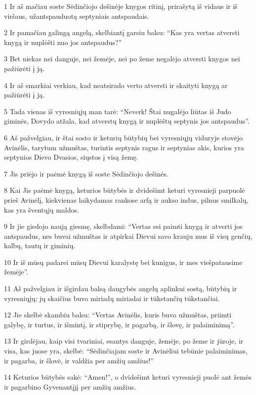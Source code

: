 \par 1 Ir aš mačiau soste Sėdinčiojo dešinėje knygos ritinį, prirašytą iš vidaus ir iš viršaus, užantspauduotą septyniais antspaudais. 
\par 2 Ir pamačiau galingą angelą, skelbiantį garsiu balsu: “Kas yra vertas atversti knygą ir nuplėšti nuo jos antspaudus?” 
\par 3 Bet niekas nei danguje, nei žemėje, nei po žeme negalėjo atversti knygos nei pažiūrėti į ją. 
\par 4 Ir aš smarkiai verkiau, kad neatsirado verto atversti ir skaityti knygą ar pažiūrėti į ją. 
\par 5 Tada vienas iš vyresniųjų man tarė: “Neverk! Štai nugalėjo liūtas iš Judo giminės, Dovydo atžala, kad atverstų knygą ir nuplėštų septynis jos antspaudus”. 
\par 6 Aš pažvelgiau, ir štai sosto ir keturių būtybių bei vyresniųjų viduryje stovėjo Avinėlis, tarytum užmuštas, turintis septynis ragus ir septynias akis, kurios yra septynios Dievo Dvasios, siųstos į visą žemę. 
\par 7 Jis priėjo ir paėmė knygą iš soste Sėdinčiojo dešinės. 
\par 8 Kai Jis paėmė knygą, keturios būtybės ir dvidešimt keturi vyresnieji parpuolė prieš Avinėlį, kiekvienas laikydamas rankose arfą ir aukso indus, pilnus smilkalų, kas yra šventųjų maldos. 
\par 9 Ir jie giedojo naują giesmę, skelbdami: “Vertas esi paimti knygą ir atverti jos antspaudus, nes buvai užmuštas ir atpirkai Dievui savo krauju mus iš visų genčių, kalbų, tautų ir giminių. 
\par 10 Ir iš mūsų padarei mūsų Dievui karalystę bei kunigus, ir mes viešpatausime žemėje”. 
\par 11 Aš pažvelgiau ir išgirdau balsą daugybės angelų aplinkui sostą, būtybių ir vyresniųjų; jų skaičius buvo miriadų miriadai ir tūkstančių tūkstančiai. 
\par 12 Jie skelbė skambiu balsu: “Vertas Avinėlis, kuris buvo užmuštas, priimti galybę, ir turtus, ir išmintį, ir stiprybę, ir pagarbą, ir šlovę, ir palaiminimą”. 
\par 13 Ir girdėjau, kaip visi tvariniai, esantys danguje, žemėje, po žeme ir jūroje, ir visa, kas juose yra, skelbė: “Sėdinčiajam soste ir Avinėliui tebūnie palaiminimas, ir pagarba, ir šlovė, ir valdžia per amžių amžius!” 
\par 14 Keturios būtybės sakė: “Amen!”, o dvidešimt keturi vyresnieji puolė ant žemės ir pagarbino Gyvenantįjį per amžių amžius.


